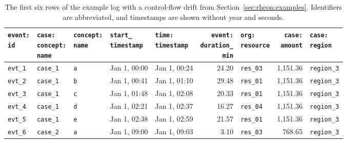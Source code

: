 \begin{table}[tb]
	\centering
	\caption[Excerpt of a Rheon log]{%
		The first six rows of the example log with a control-flow drift from Section~\ref{sec:rheon:examples}. Identifiers are abbreviated, and timestamps are shown without year and seconds.}
	\label{tab:rheon:excerpt}
	\small
	\setlength{\tabcolsep}{1.8pt}
	\begin{tabular}{@{}lllllrlrl@{}}
		\toprule
		\shortstack[l]{\texttt{event:}\\\texttt{id}} & \shortstack[l]{\texttt{case:}\\\texttt{concept:}\\\texttt{name}} & \shortstack[l]{\texttt{concept:}\\\texttt{name}} & \shortstack[l]{\texttt{start\_}\\\texttt{timestamp}} & \shortstack[l]{\texttt{time:}\\\texttt{timestamp}} & \shortstack[l]{\texttt{event:}\\\texttt{duration\_}\\\texttt{min}} & \shortstack[l]{\texttt{org:}\\\texttt{resource}} & \shortstack[l]{\texttt{case:}\\\texttt{amount}} & \shortstack[l]{\texttt{case:}\\\texttt{region}} \\
		\midrule
		\texttt{evt\_1} & \texttt{case\_1} & \texttt{a} & Jan 1, 00:00 & Jan 1, 00:24 & 24.20 & \texttt{res\_03} & 1,151.36 & \texttt{region\_3} \\
		\texttt{evt\_2} & \texttt{case\_1} & \texttt{b} & Jan 1, 00:41 & Jan 1, 01:10 & 29.48 & \texttt{res\_01} & 1,151.36 & \texttt{region\_3} \\
		\texttt{evt\_3} & \texttt{case\_1} & \texttt{c} & Jan 1, 01:48 & Jan 1, 02:08 & 20.33 & \texttt{res\_01} & 1,151.36 & \texttt{region\_3} \\
		\texttt{evt\_4} & \texttt{case\_1} & \texttt{d} & Jan 1, 02:21 & Jan 1, 02:37 & 16.27 & \texttt{res\_04} & 1,151.36 & \texttt{region\_3} \\
		\texttt{evt\_5} & \texttt{case\_1} & \texttt{e} & Jan 1, 02:38 & Jan 1, 02:59 & 21.57 & \texttt{res\_01} & 1,151.36 & \texttt{region\_3} \\
		\texttt{evt\_6} & \texttt{case\_2} & \texttt{a} & Jan 1, 09:00 & Jan 1, 09:03 & 3.10  & \texttt{res\_03} & 768.65   & \texttt{region\_3} \\
		\bottomrule
	\end{tabular}
\end{table}

